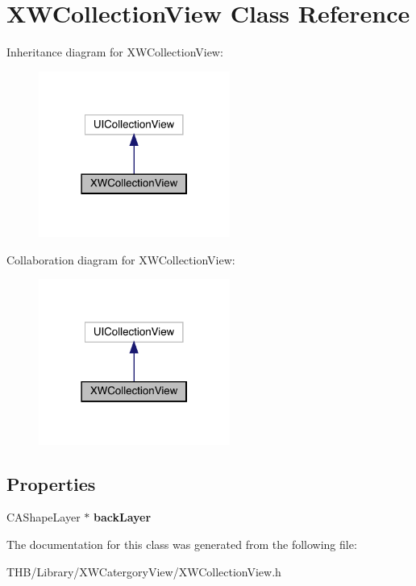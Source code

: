 \hypertarget{interface_x_w_collection_view}{}\section{X\+W\+Collection\+View Class Reference}
\label{interface_x_w_collection_view}


Inheritance diagram for X\+W\+Collection\+View\+:\nopagebreak
\begin{figure}[H]
\begin{center}
\leavevmode
\includegraphics[width=178pt]{interface_x_w_collection_view__inherit__graph}
\end{center}
\end{figure}


Collaboration diagram for X\+W\+Collection\+View\+:\nopagebreak
\begin{figure}[H]
\begin{center}
\leavevmode
\includegraphics[width=178pt]{interface_x_w_collection_view__coll__graph}
\end{center}
\end{figure}
\subsection*{Properties}
\begin{DoxyCompactItemize}
\item 
\mbox{\label{interface_x_w_collection_view_ad94312082ba41f813c56307d6ec6e8a2}} 
C\+A\+Shape\+Layer $\ast$ {\bfseries back\+Layer}
\end{DoxyCompactItemize}


The documentation for this class was generated from the following file\+:\begin{DoxyCompactItemize}
\item 
T\+H\+B/\+Library/\+X\+W\+Catergory\+View/X\+W\+Collection\+View.\+h\end{DoxyCompactItemize}
